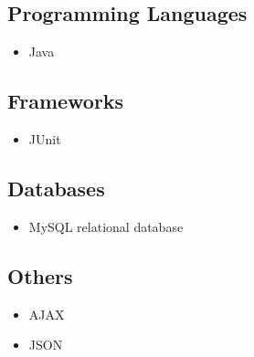 \documentclass[hidelinks, 12pt, oneside]{article}
\begin{document}
	\subsection{Programming Languages}
	\begin{itemize}
	\item Java
	\end{itemize}
	\subsection{Frameworks}
	\begin{itemize}
	\item JUnit
	\end{itemize}
	\subsection{Databases}
	\begin{itemize}
	\item MySQL relational database
	\end{itemize}
	\subsection{Others}
	\begin{itemize}
	\item AJAX
	\item JSON
	\end{itemize}					        		 
	 
\end{document}
